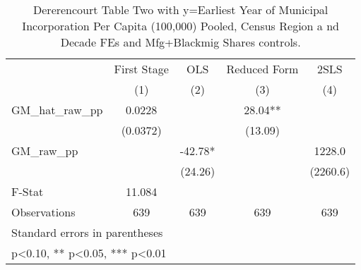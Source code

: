 \begin{table}[htbp]\centering
\def\sym#1{\ifmmode^{#1}\else\(^{#1}\)\fi}
\caption{Dererencourt Table Two with y=Earliest Year of Municipal Incorporation Per Capita (100,000) Pooled, Census Region a nd Decade FEs and Mfg+Blackmig Shares controls.}
\begin{tabular}{l*{4}{c}}
\toprule
                    & First Stage   &         OLS   &Reduced Form   &        2SLS   \\
                    &\multicolumn{1}{c}{(1)}   &\multicolumn{1}{c}{(2)}   &\multicolumn{1}{c}{(3)}   &\multicolumn{1}{c}{(4)}   \\
\midrule
GM\_hat\_raw\_pp       &      0.0228   &               &       28.04** &               \\
                    &    (0.0372)   &               &     (13.09)   &               \\
\addlinespace
GM\_raw\_pp           &               &      -42.78*  &               &      1228.0   \\
                    &               &     (24.26)   &               &    (2260.6)   \\
\midrule
F-Stat              &      11.084   &               &               &               \\
Observations        &         639   &         639   &         639   &         639   \\
\bottomrule
\multicolumn{5}{l}{\footnotesize Standard errors in parentheses}\\
\multicolumn{5}{l}{\footnotesize * p<0.10, ** p<0.05, *** p<0.01}\\
\end{tabular}
\end{table}
